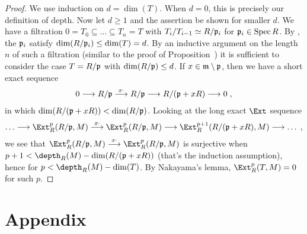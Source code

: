 \documentclass[a4paper,parskip=half,numbers=enddot, DIV=12]{scrreprt}
\begin{document}
\begin{proof}
	We use induction on $d=\dim(T)$. When $d=0$, this is precisely our definition of depth. Now let $d\geq 1$ and the assertion be shown for smaller $d$. We have a filtration $0=T_0\subseteq\ldots\subseteq T_n=T$ with $T_i/T_{i-1}\simeq R/\mathfrak{p}_i$ for $\mathfrak{p}_i\in\operatorname{Spec} R$. By \cite[Fact~3.4.1]{alg2}, the $\mathfrak{p}_i$ satisfy $\dim(R/\mathfrak{p}_i)\leq \dim(T)=d$. By an inductive argument on the length $n$ of such a filtration (similar to the proof of Proposition~) it is sufficient to consider the case $T=R/\mathfrak{p}$ with $\dim(R/\mathfrak{p})\leq d$. If $x\in\mathfrak{m}\setminus \mathfrak{p}$, then we have a short exact sequence 
	\begin{align*}
		0\morphism R/\pp\morphism[x\cdot ]R/\pp\morphism R/(\pp+xR)\morphism 0\;, 
	\end{align*}
	in which $\dim(R/(\mathfrak{p}+xR))<\dim(R/\mathfrak{p})$. Looking at the long exact $\Ext$ sequence
	\begin{align*}
		\ldots\morphism\Ext_R^p(R/\pp,M)\morphism[x\cdot]\Ext_R^p(R/\pp,M)\morphism\Ext_R^{p+1}(R/(\pp+xR),M)\morphism\ldots\;,
	\end{align*}
	we see that $\Ext_R^p(R/\pp,M)\morphism[x\cdot]\Ext_R^p(R/\pp,M)$ is surjective when $p+1<\depth_R(M)-\dim(R/(\pp+xR))$ (that's the induction assumption), hence for $p<\depth_R(M)-\dim(T)$. By Nakayama's lemma, $\Ext_R^p(T,M)=0$ for such $p$.
\end{proof}

\appendix
\chapter{Appendix}
\setcounter{thm}{0}
\renewcommand*{\thethm}{\Alph{thm}}
\end{document}

